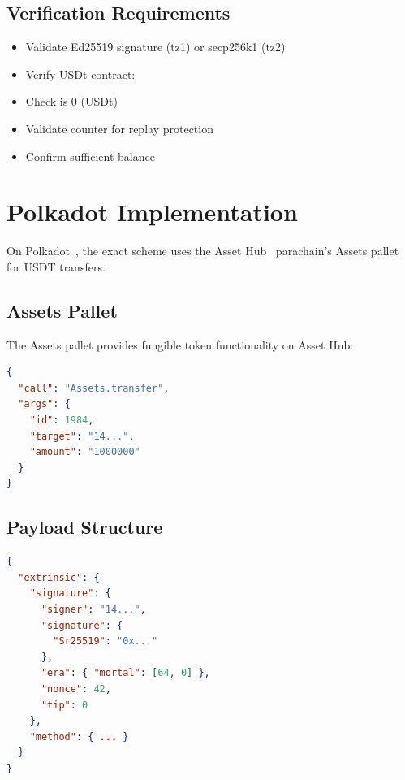 \subsection{Verification Requirements}

\begin{itemize}
    \item Validate Ed25519 signature (tz1) or secp256k1 (tz2)
    \item Verify USDt contract: 
    \item Check  is 0 (USDt)
    \item Validate counter for replay protection
    \item Confirm sufficient balance
\end{itemize}

\section{Polkadot Implementation}
\label{sec:polkadot-implementation}

On Polkadot~\cite{polkadot}, the exact scheme uses the Asset Hub~\cite{assethub} parachain's Assets pallet for USDT transfers.

\subsection{Assets Pallet}

The Assets pallet provides fungible token functionality on Asset Hub:

\begin{lstlisting}[language=json,caption={Assets.transfer call}]
{
  "call": "Assets.transfer",
  "args": {
    "id": 1984,
    "target": "14...",
    "amount": "1000000"
  }
}
\end{lstlisting}

\subsection{Payload Structure}

\begin{lstlisting}[language=json,caption={Polkadot exact scheme payload}]
{
  "extrinsic": {
    "signature": {
      "signer": "14...",
      "signature": {
        "Sr25519": "0x..."
      },
      "era": { "mortal": [64, 0] },
      "nonce": 42,
      "tip": 0
    },
    "method": { ... }
  }
}
\end{lstlisting}

